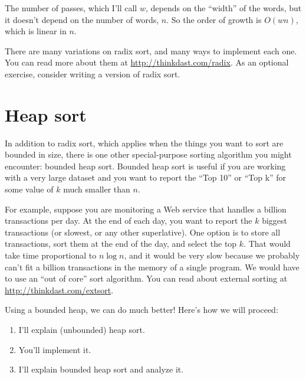 \documentclass[12pt]{book}
\theoremstyle{exercise}
\begin{document}
The number of passes, which I'll call $w$, depends on the ``width''
of the words, but it doesn't depend on the number of words, $n$.
So the order of growth is $O(wn)$, which is linear in $n$.

There are many variations on radix sort, and many ways to implement
each one. You can read more about them at
\url{http://thinkdast.com/radix}. As an optional
exercise, consider writing a version of radix sort.


\section{Heap sort}
\label{heap-sort}


In addition to radix sort, which applies when the things you want to
sort are bounded in size, there is one other special-purpose sorting
algorithm you might encounter: bounded heap sort. Bounded heap sort is
useful if you are working with a very large dataset and you want to
report the ``Top 10'' or ``Top k'' for some value of $k$ much
smaller than $n$.

For example, suppose you are monitoring a Web service that handles a
billion transactions per day. At the end of each day, you want to
report the $k$ biggest transactions (or slowest, or any other
superlative). One option is to store all transactions, sort them at
the end of the day, and select the top $k$. That would take time
proportional to $n \log n$, and it would be very slow because we
probably can't fit a billion transactions in the memory of a single
program. We would have to use an ``out of core'' sort algorithm. You
can read about external sorting at \url{http://thinkdast.com/extsort}.


Using a bounded heap, we can do much better! Here's how we will
proceed:

\begin{enumerate}

\item
  I'll explain (unbounded) heap sort.

\item
  You'll implement it.

\item
  I'll explain bounded heap sort and analyze it.

\end{enumerate}
\end{document}
